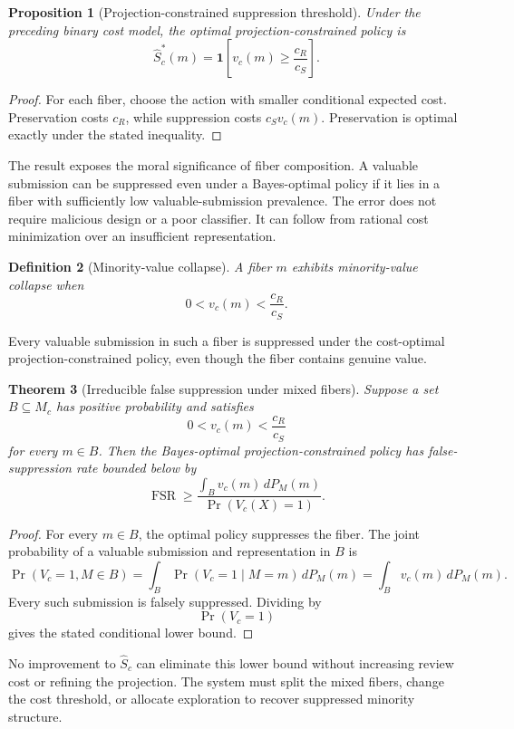 \documentclass[11pt]{article}
\newtheorem{definition}{Definition}[section]
\newtheorem{theorem}[definition]{Theorem}
\newtheorem{proposition}[definition]{Proposition}
\theoremstyle{definition}
\DeclareMathOperator{\Prob}{Pr}
\newcommand{\ind}{\mathbf{1}}
\begin{document}
\begin{proposition}[Projection-constrained suppression threshold]
Under the preceding binary cost model, the optimal projection-constrained policy is
\[
\widehat S_c^{*}(m)
=
\ind
\left[
v_c(m)\geq\frac{c_R}{c_S}
\right].
\]
\end{proposition}

\begin{proof}
For each fiber, choose the action with smaller conditional expected cost. Preservation costs \(c_R\), while suppression costs \(c_Sv_c(m)\). Preservation is optimal exactly under the stated inequality.
\end{proof}

The result exposes the moral significance of fiber composition. A valuable submission can be suppressed even under a Bayes-optimal policy if it lies in a fiber with sufficiently low valuable-submission prevalence. The error does not require malicious design or a poor classifier. It can follow from rational cost minimization over an insufficient representation.

\begin{definition}[Minority-value collapse]
A fiber \(m\) exhibits minority-value collapse when
\[
0<v_c(m)<\frac{c_R}{c_S}.
\]
\end{definition}

Every valuable submission in such a fiber is suppressed under the cost-optimal projection-constrained policy, even though the fiber contains genuine value.

\begin{theorem}[Irreducible false suppression under mixed fibers]
Suppose a set \(B\subseteq M_c\) has positive probability and satisfies
\[
0<v_c(m)<\frac{c_R}{c_S}
\]
for every \(m\in B\). Then the Bayes-optimal projection-constrained policy has false-suppression rate bounded below by
\[
\operatorname{FSR}
\geq
\frac{
\int_B v_c(m)\,dP_M(m)
}{
\Prob(V_c(X)=1)
}.
\]
\end{theorem}

\begin{proof}
For every \(m\in B\), the optimal policy suppresses the fiber. The joint probability of a valuable submission and representation in \(B\) is
\[
\Prob(V_c=1,M\in B)
=
\int_B
\Prob(V_c=1\mid M=m)\,dP_M(m)
=
\int_Bv_c(m)\,dP_M(m).
\]
Every such submission is falsely suppressed. Dividing by
\[
\Prob(V_c=1)
\]
gives the stated conditional lower bound.
\end{proof}

No improvement to \(\widehat S_c\) can eliminate this lower bound without increasing review cost or refining the projection. The system must split the mixed fibers, change the cost threshold, or allocate exploration to recover suppressed minority structure.
\end{document}
